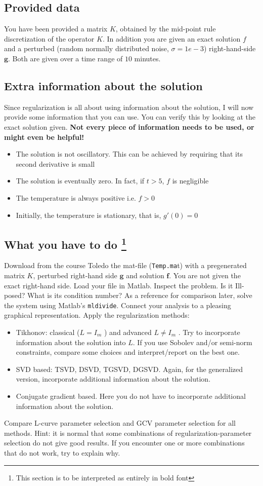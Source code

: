 \documentclass[12pt]{article}
\begin{document}
\subsection{Provided data}
You have been provided a matrix $K$, obtained by the mid-point rule discretization of the operator
$K$. In addition you are given an exact solution $f$ and a perturbed (random normally distributed noise, $\sigma = 1e-3$) right-hand-side $\mathbf{g}$. Both are given over a time range of
$10$ minutes.
\subsection{Extra information about the solution}
Since regularization is all about using information about the solution, I will now provide some information that you can use. You can verify this by looking at the exact solution given. \textbf{Not every piece of information needs to be used, or might even be helpful!}
\begin{itemize}
\item[(1)] The solution is not oscillatory. This can be achieved by requiring that its second derivative is
small
\item[(2)] The solution is eventually zero. In fact, if $t > 5$, $f$ is negligible
\item[(3)]The temperature is always positive i.e. $f > 0$
\item[(4)]Initially, the temperature is stationary, that is, $g'(0) = 0$
\end{itemize}
\subsection{What you have to do \protect\footnote{This section is to be interpreted as entirely in bold font} }
Download from the course Toledo the mat-file (\texttt{Temp.ma}t) with a pregenerated matrix $K$, perturbed
right-hand side $\textbf{g}$ and solution $\textbf{f}$. You are not given the exact right-hand side. Load your file in Matlab. Inspect the problem. Is it Ill-posed? What is its condition number? As a reference for comparison later, solve the system using Matlab’s \texttt{mldivide}. Connect your analysis to a pleasing graphical representation.
Apply the regularization methods:
\begin{itemize}
\item[(1)] Tikhonov: classical ($L = I_m$ ) and advanced $L \neq I_m$ . Try to incorporate information about the solution into $L$. If you use Sobolev and/or semi-norm constraints, compare some choices and interpret/report on the best one. \item[(2)] SVD based: TSVD, DSVD, TGSVD, DGSVD. Again, for the generalized version, incorporate additional information about the solution.
\item[(3)]Conjugate gradient based. Here you do not have to incorporate additional information about the solution.
\end{itemize}
Compare L-curve parameter selection and GCV parameter selection for all methods. Hint: it is normal that some combinations of regularization-parameter selection do not give good results. If you encounter one or more combinations that do not work, try to explain why.
\end{document}
